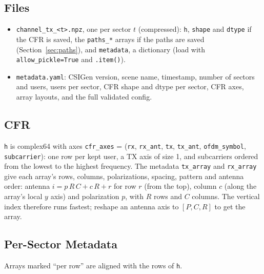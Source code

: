 \documentclass{article}
\begin{document}
\subsection{Files}
\begin{itemize}
  \item \texttt{channel\_tx\_<t>.npz}, one per sector $t$ (compressed): \texttt{h}, \texttt{shape} and \texttt{dtype} if the CFR is saved, the \texttt{paths\_*} arrays if the paths are saved (Section~\ref{sec:paths}), and \texttt{metadata}, a dictionary (load with \texttt{allow\_pickle=True} and \texttt{.item()}).
  \item \texttt{metadata.yaml}: CSIGen version, scene name, timestamp, number of sectors and users, users per sector, CFR shape and dtype per sector, CFR axes, array layouts, and the full validated config.
\end{itemize}

\subsection{CFR}
\texttt{h} is complex64 with axes \texttt{cfr\_axes} = (\texttt{rx}, \texttt{rx\_ant}, \texttt{tx}, \texttt{tx\_ant}, \texttt{ofdm\_symbol}, \texttt{subcarrier}): one row per kept user, a TX axis of size 1, and subcarriers ordered from the lowest to the highest frequency. The metadata \texttt{tx\_array} and \texttt{rx\_array} give each array's rows, columns, polarizations, spacing, pattern and antenna order: antenna $i = p\,R\,C + c\,R + r$ for row $r$ (from the top), column $c$ (along the array's local $y$ axis) and polarization $p$, with $R$ rows and $C$ columns. The vertical index therefore runs fastest; reshape an antenna axis to $[P, C, R]$ to get the array.

\subsection{Per-Sector Metadata}
Arrays marked ``per row'' are aligned with the rows of \texttt{h}.
\end{document}

